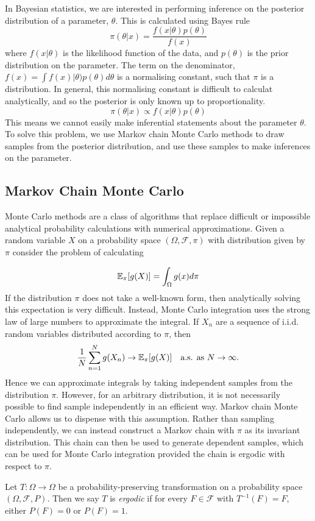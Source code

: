 In Bayesian statistics, we are interested in performing inference on the posterior distribution of a parameter, $\theta$.  This is calculated using Bayes rule
$$
\pi(\theta | x) = \frac{f(x | \theta) p(\theta)}{f(x)}
$$
where $f(x|\theta)$ is the likelihood function of the data, and $p(\theta)$ is the prior distribution on the parameter.  The term on the denominator, $f(x)=\int f(x)|\theta) p(\theta) d\theta$ is a normalising constant, such that $\pi$ is a distribution.  In general, this normalising constant is difficult to calculat analytically, and so the posterior is only known up to proportionality.
$$
\pi(\theta | x) \propto f(x | \theta) p(\theta)
$$
This means we cannot easily make inferential statements about the parameter $\theta$.  To solve this problem, we use Markov chain Monte Carlo methods to draw samples from the posterior distribution, and use these samples to make inferences on the parameter.

\subsection{Markov Chain Monte Carlo}
Monte Carlo methods are a class of algorithms that replace difficult or impossible analytical probability calculations with numerical approximations.  Given a random variable $X$ on a probability space $(\Omega,\mathcal{F}, \pi)$ with distribution given by $\pi$ consider the problem of calculating

$$
\mathbb{E}_\pi[g(X)] = \int_\Omega g(x) d \pi
$$
If the distribution $\pi$ does not take a well-known form, then analytically solving this expectation is very difficult.  Instead, Monte Carlo integration uses the strong law of large numbers to approximate the integral.  If $X_n$ are a sequence of i.i.d. random variables distributed according to $\pi$, then
$$
\frac{1}{N} \sum_{n=1}^N g(X_n) \to \mathbb{E}_\pi[g(X)] \quad \text{a.s. as $N \to \infty$.}
$$
Hence we can approximate integrals by taking independent samples from the distribution $\pi$.  However, for an arbitrary distribution, it is not necessarily possible to find sample independently in an efficient way.  Markov chain Monte Carlo allows us to dispense with this assumption.  Rather than sampling independently, we can instead construct a Markov chain with $\pi$ as its invariant distribution.  This chain can then be used to generate dependent samples, which can be used for Monte Carlo integration provided the chain is ergodic with respect to $\pi$.

\begin{defn}[Ergodicity]
Let $T:\Omega \to \Omega$ be a probability-preserving transformation on a probability space $(\Omega,\mathcal{F}, P)$.  Then we say $T$ is \emph{ergodic} if for every $F \in \mathcal{F}$ with $T^{-1}(F)=F$, either $P(F)=0$ or $P(F)=1$.
\end{defn}

